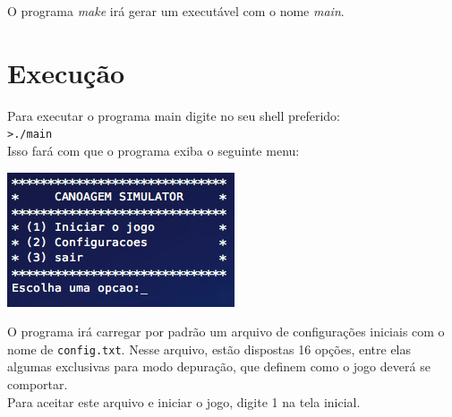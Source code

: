 \documentclass[11pt,a4paper]{article}
\begin{document}
O programa \textit{make} irá gerar um executável com o nome \textit{main}.
	
\section{Execução}
Para executar o programa main digite no seu shell preferido:\\

\verb|>./main| \\

Isso fará com que o programa exiba o seguinte menu:
\begin{center}
\includegraphics[scale=0.6]{menu.png}
\end{center}

O programa irá carregar por padrão um arquivo de configurações iniciais com o nome de \verb|config.txt|. Nesse arquivo, estão dispostas 16 opções, entre elas algumas exclusivas para modo depuração, que definem como o jogo deverá se comportar.\\

Para aceitar este arquivo e iniciar o jogo, digite 1 na tela inicial.\\
\end{document}

